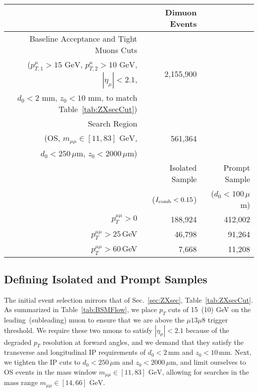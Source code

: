 \documentclass[aps,prd,twocolumn,superscriptaddress,preprintnumbers,nofootinbib,longbibliography,floatfix]{revtex4-1}
\newcommand{\ptmm}{p_T^{\mu\mu}}
\newcommand{\GeV}{\text{~GeV}}
\DeclareRobustCommand{\Sec}[1]{Sec.~\ref{#1}}
\DeclareRobustCommand{\Tab}[1]{Table~\ref{#1}}
\begin{document}
\begin{table*}[t!]
\centering
\begin{tabular}{r @{$\quad$} r @{$\quad$} r} 
 \hline
 \hline
  & Dimuon Events & \\
 \hline
 Baseline Acceptance and Tight Muons Cuts &  \multirow{3}{*}{2,155,900}  & \\
 ($p_{T,1}^\mu > 15 \GeV$, $p_{T,2}^\mu> 10 \GeV$, $|\eta_\mu|<2.1$, \\
  $d_0<2$ mm, $z_0<10$ mm, to match \Tab{tab:ZXsecCut}) & \\
 \hline
 Search Region & \multirow{3}{*}{561,364} & \\
 (OS, $m_{\mu\mu} \in [11,83]  \GeV$, & \\
 $d_0<250\,\mu$m, $z_0<2000\,\mu$m)  & \\
\hline
\hline
&  Isolated Sample & Prompt Sample \\
&  ($I_{\rm comb} <0.15$) & ($d_0<100\,\mu$m)  \\

 \hline
 \hline
 $\ptmm>0$  & 188,924 & 412,002 \\
 $\ptmm>25\,$GeV  &46,798 & 91,264 \\
 $\ptmm>60\,$GeV  &7,668 & 11,208 \\
\hline
 \hline
 \end{tabular}
\caption{Cut flow for the $V\to\mu^+\mu^-$ search, illustrating the number of CMS11a events surviving various requirements.  The population of the six signal regions is shown.
}
\label{tab:BSMFlow}
\end{table*}

\subsection{Defining Isolated and Prompt Samples}

The initial event selection mirrors that of \Sec{sec:ZXsec}, \Tab{tab:ZXsecCut}.
%
As summarized in \Tab{tab:BSMFlow}, we place $p_T$ cuts of 15~(10) GeV on the leading~(subleading) muon to ensure that we are above the $\mu13\mu8$ trigger threshold.
%
We require these two muons to satisfy $|\eta_\mu|<2.1$ because of the degraded $p_T$ resolution at forward angles, and we demand that they satisfy the transverse and longitudinal IP requirements of $d_0<2$\,mm and $z_0<10$\,mm.
%
Next, we tighten the IP cuts to $d_0<250 \, \mu$m and $z_0< 2000 \, \mu$m, and limit ourselves to OS events in the mass window  $m_{\mu\mu} \in [11,83] \GeV$, allowing for searches in the mass range $m_{\mu\mu} \in [14,66] \GeV$.
\end{document}
